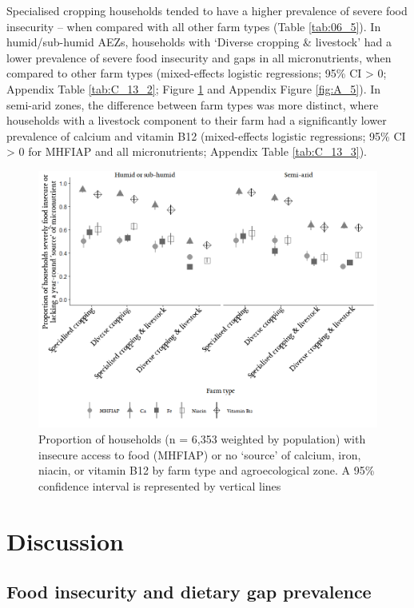 Specialised cropping households tended to have a higher prevalence of severe food insecurity -- when compared with all other farm types (Table \ref{tab:06_5}). In humid/sub-humid AEZs, households with `Diverse cropping \& livestock' had a lower prevalence of severe food insecurity and gaps in all micronutrients, when compared to other farm types (mixed-effects logistic regressions; 95\% CI > 0; Appendix Table \ref{tab:C_13_2}; Figure \ref{fig:06_4} and Appendix Figure \ref{fig:A_5}). In semi-arid zones, the difference between farm types was more distinct, where households with a livestock component to their farm had a significantly lower prevalence of calcium and vitamin B12 (mixed-effects logistic regressions; 95\% CI > 0 for MHFIAP and all micronutrients; Appendix Table \ref{tab:C_13_3}).

\begin{figure}[H]
  \includegraphics[width=1\textwidth]{figs_06/image4_weighted2.png}
  \captionsetup{singlelinecheck = false, justification=justified}
  \caption{Proportion of households (n = 6,353 weighted by population) with insecure access to food (MHFIAP) or no `source' of calcium, iron, niacin, or vitamin B12 by farm type and agroecological zone. A 95\% confidence interval is represented by vertical lines}
  \label{fig:06_4}
\end{figure}

\section{Discussion}

\subsection{Food insecurity and dietary gap prevalence}

